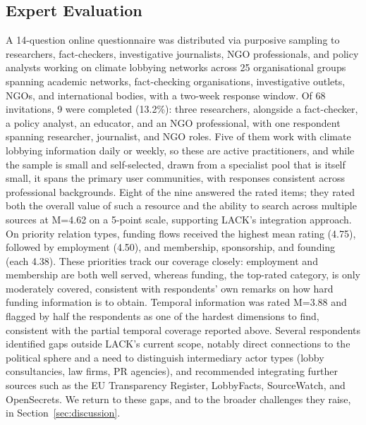 \vspace{-0.3cm}\subsection{Expert Evaluation}\vspace{-0.2cm}
\label{sec:eval:experts}
A 14-question online questionnaire was distributed via purposive sampling to researchers, fact-checkers, investigative journalists, NGO professionals, and policy analysts working on climate lobbying networks across 25 organisational groups spanning academic networks, fact-checking organisations, investigative outlets, NGOs, and international bodies, with a two-week response window.
Of 68 invitations, 9 were completed (13.2\%): three researchers, alongside a fact-checker, a policy analyst, an educator, and an NGO professional, with one respondent spanning researcher, journalist, and NGO roles.
Five of them work with climate lobbying information daily or weekly, so these are active practitioners, and while the sample is small and self-selected, drawn from a specialist pool that is itself small, it spans the primary user communities, with responses consistent across professional backgrounds.
Eight of the nine answered the rated items; they rated both the overall value of such a resource and the ability to search across multiple sources at M=4.62 on a 5-point scale, supporting LACK's integration approach.
On priority relation types, funding flows received the highest mean rating (4.75), followed by employment (4.50), and membership, sponsorship, and founding (each 4.38).
These priorities track our coverage closely: employment and membership are both well served, whereas funding, the top-rated category, is only moderately covered, consistent with respondents' own remarks on how hard funding information is to obtain.
Temporal information was rated M=3.88 and flagged by half the respondents as one of the hardest dimensions to find, consistent with the partial temporal coverage reported above.
Several respondents identified gaps outside LACK's current scope, notably direct connections to the political sphere and a need to distinguish intermediary actor types (lobby consultancies, law firms, PR agencies), and recommended integrating further sources such as the EU Transparency Register, LobbyFacts, SourceWatch, and OpenSecrets.
We return to these gaps, and to the broader challenges they raise, in Section~\ref{sec:discussion}.